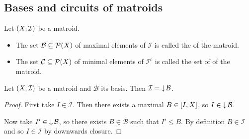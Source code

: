 \subsection{Bases and circuits of matroids}
\begin{definition}
Let $\sSet{X,\mathcal{I}}$ be a matroid.
\begin{itemize}
\item The set $\mathcal{B} \subseteq \operatorname{\mathcal{P}}(X)$ of maximal elements of $\mathcal{I}$ is called the  of the matroid.
\item The set $\mathcal{C}\subseteq \operatorname{\mathcal{P}}(X)$ of minimal elements of $\mathcal{I}^c$ is called the set of  of the matroid.
\end{itemize}
\end{definition}

\begin{lemma}
Let $\sSet{X,\mathcal{I}}$ be a matroid and $\mathcal{B}$ its basis. Then $\mathcal{I} = \operatorname{\downarrow} \mathcal{B}$.
\end{lemma}
\begin{proof}
First take $I\in \mathcal{I}$. Then there exists a maximal $B\in \interval{I, X}$, so $I\in \operatorname{\downarrow} \mathcal{B}$.

Now take $I'\in \operatorname{\downarrow} \mathcal{B}$, so there exists $B\in \mathcal{B}$ such that $I'\leq B$. By definition $B\in \mathcal{I}$ and so $I\in \mathcal{I}$ by downwards closure.
\end{proof}

